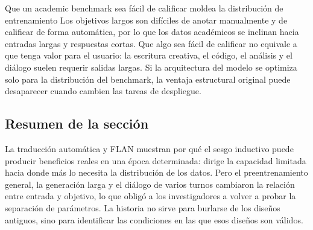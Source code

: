\begin{warningbox}{Que un academic benchmark sea fácil de calificar moldea la distribución de entrenamiento}
Los objetivos largos son difíciles de anotar manualmente y de calificar de forma automática, por lo que los datos académicos se inclinan hacia entradas largas y respuestas cortas. Que algo sea fácil de calificar no equivale a que tenga valor para el usuario: la escritura creativa, el código, el análisis y el diálogo suelen requerir salidas largas. Si la arquitectura del modelo se optimiza solo para la distribución del benchmark, la ventaja estructural original puede desaparecer cuando cambien las tareas de despliegue.
\end{warningbox}

\subsection{Resumen de la sección}

La traducción automática y FLAN muestran por qué el sesgo inductivo puede producir beneficios reales en una época determinada: dirige la capacidad limitada hacia donde más lo necesita la distribución de los datos. Pero el preentrenamiento general, la generación larga y el diálogo de varios turnos cambiaron la relación entre entrada y objetivo, lo que obligó a los investigadores a volver a probar la separación de parámetros. La historia no sirve para burlarse de los diseños antiguos, sino para identificar las condiciones en las que esos diseños son válidos.
